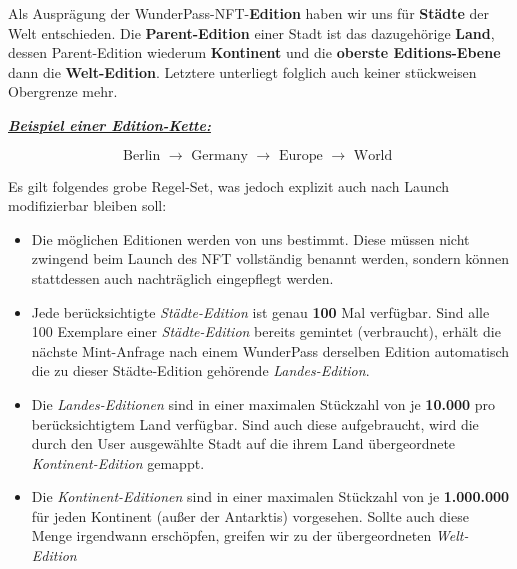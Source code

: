 \begin{NFT-Prop}[Edition]

Als Ausprägung der WunderPass-NFT-\textbf{Edition} haben wir uns für \textbf{Städte} der Welt entschieden. Die \textbf{Parent-Edition} einer Stadt ist das dazugehörige \textbf{Land}, dessen 
Parent-Edition wiederum \textbf{Kontinent} und die \textbf{oberste Editions-Ebene} dann die \textbf{Welt-Edition}. Letztere unterliegt folglich auch keiner stückweisen Obergrenze mehr.

\vspace{0.2cm}

\underline{\textbf{\textit{Beispiel einer Edition-Kette:}}}

\vspace{0.2cm}

\begin{equation*}
\textrm{Berlin } \rightarrow \textrm{ Germany } \rightarrow \textrm{ Europe } \rightarrow \textrm{ World }
\end{equation*} 

\vspace{0.2cm}

Es gilt folgendes grobe Regel-Set, was jedoch explizit auch nach Launch modifizierbar bleiben soll:

\begin{itemize}
    \item Die möglichen Editionen werden von uns bestimmt. Diese müssen nicht zwingend beim Launch des NFT vollständig benannt werden, sondern können stattdessen auch nachträglich eingepflegt werden.
    \item Jede berücksichtigte \textit{Städte-Edition} ist genau \textbf{100} Mal verfügbar. Sind alle 100 Exemplare einer \textit{Städte-Edition} bereits gemintet (verbraucht), erhält die nächste Mint-Anfrage nach einem WunderPass derselben Edition automatisch die zu dieser Städte-Edition gehörende \textit{Landes-Edition}.
    \item Die \textit{Landes-Editionen} sind in einer maximalen Stückzahl von je \textbf{10.000} pro berücksichtigtem Land verfügbar. Sind auch diese aufgebraucht, wird die durch den User ausgewählte Stadt auf die ihrem Land übergeordnete \textit{Kontinent-Edition} gemappt.
    \item Die \textit{Kontinent-Editionen} sind in einer maximalen Stückzahl von je \textbf{1.000.000} für jeden Kontinent (außer der Antarktis) vorgesehen. Sollte auch diese Menge irgendwann erschöpfen, greifen wir zu der übergeordneten \textit{Welt-Edition}
\end{itemize} 

\end{NFT-Prop}

